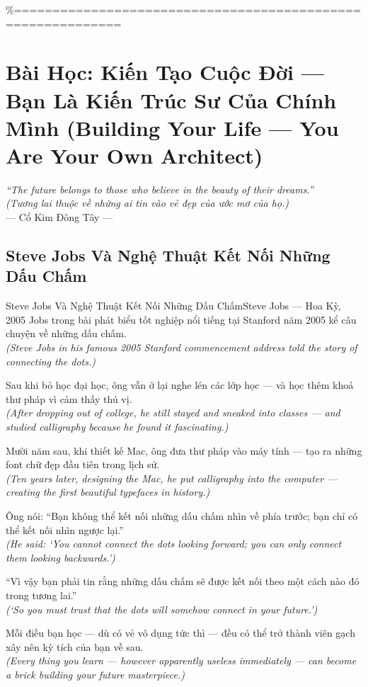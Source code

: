 \%============================================================
\chapter{Bài Học: Kiến Tạo Cuộc Đời --- Bạn Là Kiến Trúc Sư Của Chính Mình (Building Your Life --- You Are Your Own Architect)}
\begin{center}
  \textit{\color{truyengold}``The future belongs to those who believe in the beauty of their dreams.''}\\[4pt]
  \textit{(Tương lai thuộc về những ai tin vào vẻ đẹp của ước mơ của họ.)}\\[4pt]
  \small\color{truyenblue}--- Cổ Kim Đông Tây ---
\end{center}
\ngancach

\section{Steve Jobs Và Nghệ Thuật Kết Nối Những Dấu Chấm}
\begin{truyen}{Steve Jobs Và Nghệ Thuật Kết Nối Những Dấu Chấm}{Steve Jobs --- Hoa Kỳ, 2005}
 Jobs trong bài phát biểu tốt nghiệp nổi tiếng tại Stanford năm 2005 kể câu chuyện về những dấu chấm.\\[4pt]
\textit{(Steve Jobs in his famous 2005 Stanford commencement address told the story of connecting the dots.)}

Sau khi bỏ học đại học, ông vẫn ở lại nghe lén các lớp học --- và học thêm khoá thư pháp vì cảm thấy thú vị.\\[4pt]
\textit{(After dropping out of college, he still stayed and sneaked into classes --- and studied calligraphy because he found it fascinating.)}

Mười năm sau, khi thiết kế Mac, ông đưa thư pháp vào máy tính --- tạo ra những font chữ đẹp đầu tiên trong lịch sử.\\[4pt]
\textit{(Ten years later, designing the Mac, he put calligraphy into the computer --- creating the first beautiful typefaces in history.)}

Ông nói: ``Bạn không thể kết nối những dấu chấm nhìn về phía trước; bạn chỉ có thể kết nối nhìn ngược lại.''\\[4pt]
\textit{(He said: `You cannot connect the dots looking forward; you can only connect them looking backwards.')}

``Vì vậy bạn phải tin rằng những dấu chấm sẽ được kết nối theo một cách nào đó trong tương lai.''\\[4pt]
\textit{(`So you must trust that the dots will somehow connect in your future.')}

\end{truyen}
\begin{baihoc}
  Mỗi điều bạn học --- dù có vẻ vô dụng tức thì --- đều có thể trở thành viên gạch xây nên kỳ tích của bạn về sau.\\[4pt]
  \textit{(Every thing you learn --- however apparently useless immediately --- can become a brick building your future masterpiece.)}
\end{baihoc}

